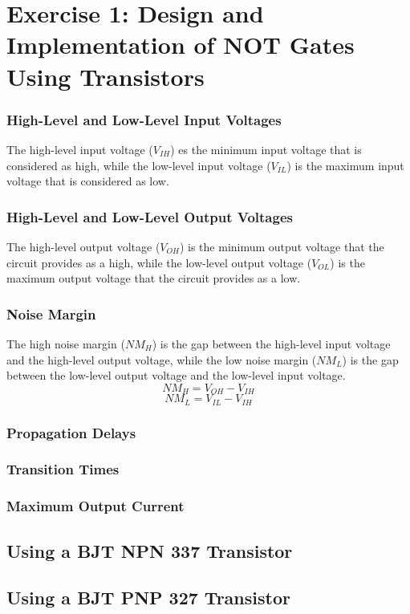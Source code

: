 \documentclass[a4paper,11pt]{report}
\begin{document}
\section{\color{olive}Exercise 1: Design and Implementation of NOT Gates Using Transistors}


\subsubsection{\color{red}High-Level and Low-Level Input Voltages}
The high-level input voltage ($V_{IH}$) es the minimum input voltage that is considered as high, while the low-level input voltage ($V_{IL}$)  is the maximum input voltage that is considered as low.

\subsubsection{\color{red}High-Level and Low-Level Output Voltages}
The high-level output voltage ($V_{OH}$) is the minimum output voltage that the circuit provides as a high, while the low-level output voltage ($V_{OL}$) is the maximum output voltage that the circuit provides as a low.

\subsubsection{\color{red}Noise Margin}
The high noise margin ($NM_{H}$) is the gap between the high-level input voltage and the high-level output voltage, while the low noise margin ($NM_{L}$) is the gap between the low-level output voltage and the low-level input voltage.
$$NM_{H} = V_{OH} - V_{IH}$$
$$NM_{L} = V_{IL} - V_{IH}$$

\subsubsection{\color{red}Propagation Delays}

\subsubsection{\color{red}Transition Times}

\subsubsection{\color{red}Maximum Output Current}

\subsection{\color{purple}Using a BJT NPN 337 Transistor}

\subsection{\color{purple}Using a BJT PNP 327 Transistor}
\end{document}
